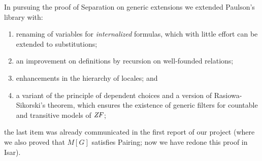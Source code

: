 
In pursuing the proof of Separation on generic extensions we
extended Paulson's library with:
\begin{enumerate}
\item renaming of variables for \emph{internalized} formulas, which
  with little effort can be extended 
  to substitutions;
\item an improvement on definitions by recursion on well-founded
  relations; 
\item enhancements in the hierarchy of locales; and
\item a variant of the  principle of dependent choices and a version
  of Rasiowa-Sikorski's theorem, which 
  ensures the existence of generic filters for countable and transitive
  models of $\mathit{ZF}$;
\end{enumerate}
the last item was already communicated in the first report
\cite{2018arXiv180705174G} of our project (where we also proved that
$M[G]$ satisfies Pairing; now we have redone this proof in Isar).
  
